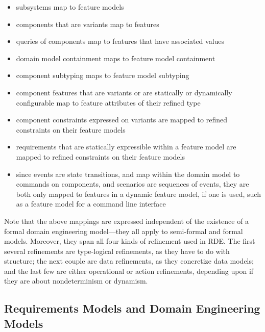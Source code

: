 \documentclass[10pt,letterpaper]{article}
\begin{document}
\begin{itemize}

    \item subsystems map to feature models
    
    \item components that are variants map to features
    
    \item queries of components map to features that have associated values
    
    \item domain model containment maps to feature model containment
    
    \item component subtyping maps to feature model subtyping
    
    \item component features that are variants or are statically or dynamically configurable map to feature attributes of their refined type
    
    \item component constraints expressed on variants are mapped to refined constraints on their feature models
    
    \item requirements that are statically expressible within a feature model are mapped to refined constraints on their feature models
    
    \item since events are state transitions, and map within the domain model to commands on components, and scenarios are sequences of events, they are both only mapped to features in a dynamic feature model, if one is used, such as a feature model for a command line interface

\end{itemize}

Note that the above mappings are expressed independent of the existence of a formal domain engineering model---they all apply to semi-formal and formal models. Moreover, they span all four kinds of refinement used in RDE. The first several refinements are type-logical refinements, as they have to do with structure; the next couple are data refinements, as they concretize data models; and the last few are either operational or action refinements, depending upon if they are about nondeterminism or dynamism.

\subsection{Requirements Models and Domain Engineering Models}
\label{requirements-models-and-domain-engineering-models}
\end{document}

